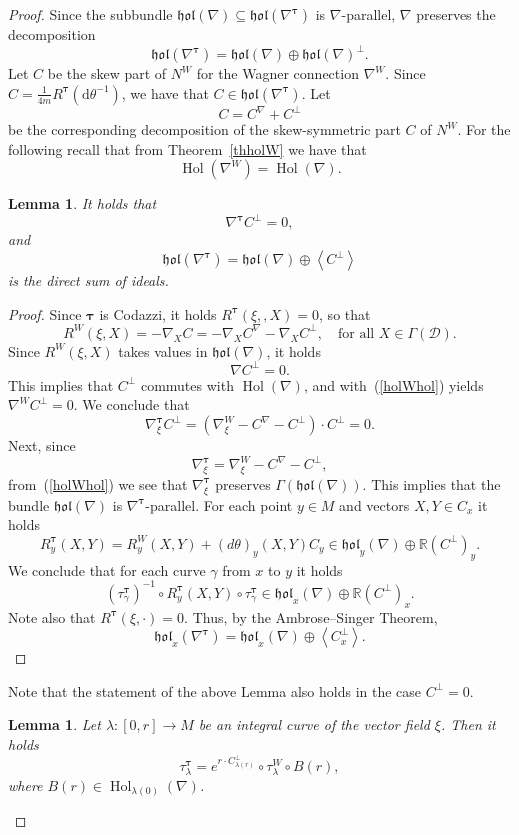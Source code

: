 \documentclass{amsart}
\theoremstyle{plain}
\newtheorem{lem}[theorem]{Lemma}
\theoremstyle{definition}
\newcommand{\Hol}{\operatorname{Hol}}
\newcommand{\hol}{\mathfrak{hol}}
\newcommand{\bt}{{\boldsymbol{\tau}}}
\newcommand{\Real}{\mathbb{R}}
\newcommand{\1}{\mathbf{1}}
\newcommand{\D}{{\mathcal D}}
\renewcommand{\d}{\mathrm{d}}
\newcommand{\+}{\oplus}
\begin{document}
\begin{proof}  Since the subbundle $\hol(\nabla)\subseteq\hol(\nabla^\bt)$ is $\nabla$-parallel,   $\nabla$ preserves the decomposition
$$
\hol(\nabla^\bt)=\hol(\nabla) \oplus \hol(\nabla)^\bot.$$ 
Let $C$ be the skew part of $N^W$ for the Wagner connection $\nabla^W$.  Since $C=\tfrac{1}{4m} R^\bt(\d \theta^{-1})$, we have that $C\in \hol(\nabla^\bt) $. Let $$C=C^\nabla+C^\bot$$ be the corresponding decomposition of the skew-symmetric part $C$ of $N^W$.
For the following recall that from Theorem~\ref{thholW} we have that  \begin{equation}
\label{holWhol}\Hol(\nabla^W)=\Hol(\nabla).\end{equation}


\begin{lem} It holds that $$\nabla^\bt C^\bot=0,$$ and
	$$\hol(\nabla^\bt)=\hol(\nabla) \oplus \left<C^\bot\right>  $$ is the direct sum of ideals.
\end{lem}

\begin{proof}  Since $\bt$ is Codazzi, it holds $R^\bt(\xi,,X)=0$, so that 
$$R^W(\xi,X)=-\nabla_XC=-\nabla_XC^\nabla-\nabla_XC^\bot,\quad\text{for all } X\in\Gamma(\D).$$
Since $R^W(\xi,X)$ takes values in $\hol(\nabla)$, it holds 
$$\nabla C^\bot=0.$$ This implies that $ C^\perp$ commutes with $\Hol(\nabla)$, and with~(\ref{holWhol})  yields  $\nabla^W C^\bot=0$.
We conclude that
$$\nabla^\bt_\xi C^\bot=(\nabla^W_\xi-C^\nabla-C^\bot)\cdot C^\bot=0.$$
Next, since
$$\nabla^\bt_\xi =\nabla^W_\xi-C^\nabla-C^\bot,$$
from~(\ref{holWhol}) we see that $\nabla^\bt_\xi$ preserves $\Gamma(\hol(\nabla))$. This implies that the bundle $\hol(\nabla)$ is $\nabla^\bt$-parallel.
For each point $y\in M$ and vectors $X,Y\in C_x$ it holds 
$$R^\bt_y(X,Y)=R^W_y(X,Y)+(d\theta)_y(X,Y)C_y\in\hol_y(\nabla)\oplus\Real (C^\bot)_y.$$
We conclude that for each curve $\gamma$ from $x$ to $y$ it holds
$$(\tau^\bt_\gamma)^{-1}\circ R^\bt_y(X,Y)\circ\tau^\bt_\gamma\in  \hol_x(\nabla)\oplus\Real (C^\bot)_x.$$ Note also that $R^\bt(\xi,\cdot)=0.$
Thus, by the Ambrose--Singer Theorem, 
$$\hol_x(\nabla^\bt)=\hol_x(\nabla) \oplus \left<C_x^\bot\right>.$$ \end{proof}

Note that the statement of the above Lemma also holds  in the case $C^\bot=0$.

\begin{lem}\label{lemxi1} Let $\lambda:[0,r]\to M$ be an integral curve of the vector field $\xi$. Then it holds
	$$\tau_\lambda^\bt=e^{r\cdot C^\bot_{\lambda(r)}}\circ \tau_\lambda^W\circ B(r),$$ where $B(r)\in\Hol_{\lambda(0)}(\nabla)$.
\end{lem}


\end{proof}
\end{document}
